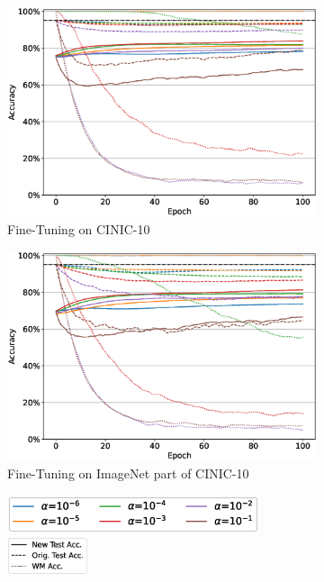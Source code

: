 \begin{figure}
\centering
\begin{subfigure}[b]{0.49\textwidth}
    \centering
    \includegraphics[width=\linewidth]{images/finetuning/finetuning_protecting_content_smoothed_imagenet_0.eps}
    \caption{Fine-Tuning on CINIC-10}
    \label{fig:fine-tuning-cinic10}
\end{subfigure}
\begin{subfigure}[b]{0.49\textwidth}
    \centering
    \includegraphics[width=\linewidth]{images/finetuning/finetuning_protecting_content_smoothed_imagenet_1.eps}
    \caption{Fine-Tuning on ImageNet part of CINIC-10}
    \label{fig:fine-tuning-cinic10-imagenet}
\end{subfigure}

\begin{subfigure}[b]{\linewidth}
    \centering
    \includegraphics[height=1.1cm]{images/finetuning/legend_content_finetuning_imagenet_colors.eps}
    \quad
    \includegraphics[height=1.1cm]{images/finetuning/legend_content_finetuning_imagenet_linetypes.eps}
\end{subfigure}


\end{figure}

